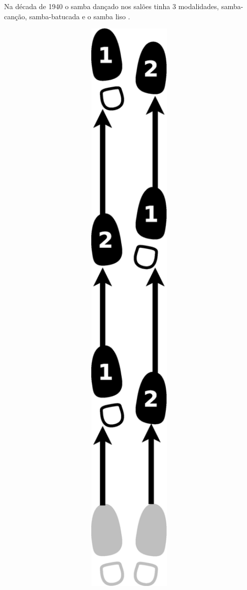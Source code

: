 Na década de 1940 o samba dançado nos salões 
tinha 3 modalidades, samba-canção, samba-batucada e o samba liso \cite[pp. 58]{freitas1959danca} \cite[pp. 142-143]{perna2002samba} 
\cite[pp. 51]{fornaciari1947aprender}\cite[pp. 51]{fornaciari1950aprender}.

\begin{figure}[h]
    \centering
    \begin{subfigure}[b]{0.65\textwidth}
        \centering
        \includegraphics[angle=270,width=0.97\textwidth]{chapters/cap-historia-sambagafieira/samba-cancao-basico-frente.eps}

\end{subfigure}
\end{figure}
